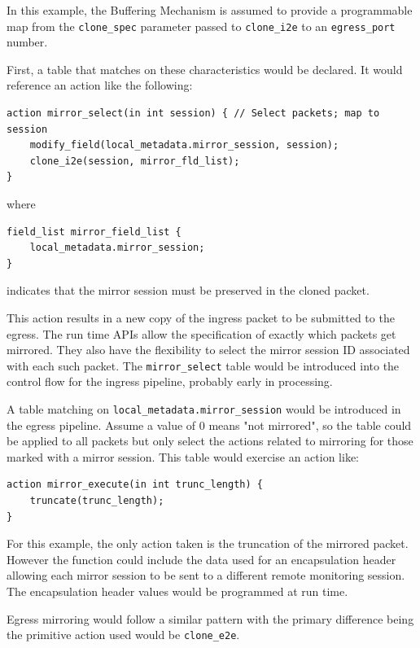 \documentclass[12pt]{article}
\begin{document}
In this example, the Buffering Mechanism is assumed to provide a programmable 
map from the \texttt{clone_spec} parameter passed to \texttt{clone_i2e} to an \texttt{egress_port} number.

First, a table that matches on these characteristics would be declared. It 
would reference an action like the following:

\begin{lstlisting}[style=P4style]
action mirror_select(in int session) { // Select packets; map to session
    modify_field(local_metadata.mirror_session, session);
    clone_i2e(session, mirror_fld_list);
}
\end{lstlisting}

where

\begin{lstlisting}[style=P4style]
field_list mirror_field_list {
    local_metadata.mirror_session;
}
\end{lstlisting}

indicates that the mirror session must be preserved in the cloned packet.

This action results in a new copy of the ingress packet to be submitted to 
the egress. The run time APIs allow the specification of exactly which packets 
get mirrored. They also have the flexibility to select the mirror session 
ID associated with each such packet. The \texttt{mirror_select} table would be introduced 
into the control flow for the ingress pipeline, probably early in processing. 


A table matching on \texttt{local_metadata.mirror_session} would be introduced 
in the egress pipeline. Assume a value of 0 means "not mirrored", so the table 
could be applied to all packets but only select the actions related to mirroring 
for those marked with a mirror session. This table would exercise an action 
like:

\begin{lstlisting}[style=P4style]
action mirror_execute(in int trunc_length) {
    truncate(trunc_length);
}
\end{lstlisting}


For this example, the only action taken is the truncation of the mirrored 
packet. However the function could include the data used for an encapsulation 
header allowing each mirror session to be sent to a different remote monitoring 
session. The encapsulation header values would be programmed at run time.

Egress mirroring would follow a similar pattern with the primary difference 
being the primitive action used would be \texttt{clone_e2e}.
\end{document}
